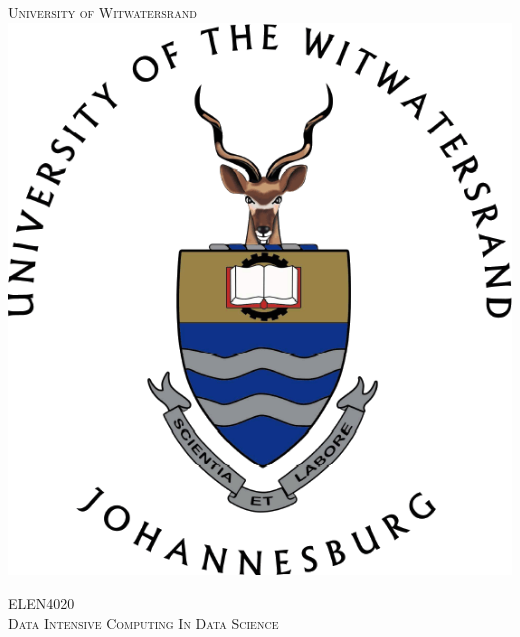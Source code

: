\documentclass[10pt, conference]{IEEEtran}
\begin{document}
\begin{titlepage}
\newcommand{\HRule}{\rule{\linewidth}{0.5mm}} %

\center %
 

\textsc{\LARGE University of Witwatersrand}\\[1.5cm] %

\includegraphics[scale=0.25]{Wits.png}%
 
 
\textsc{\Large ELEN4020}\\[0.5cm] %
\textsc{\large Data Intensive Computing In Data Science}\\[0.5cm] %




\end{titlepage}
\end{document}
